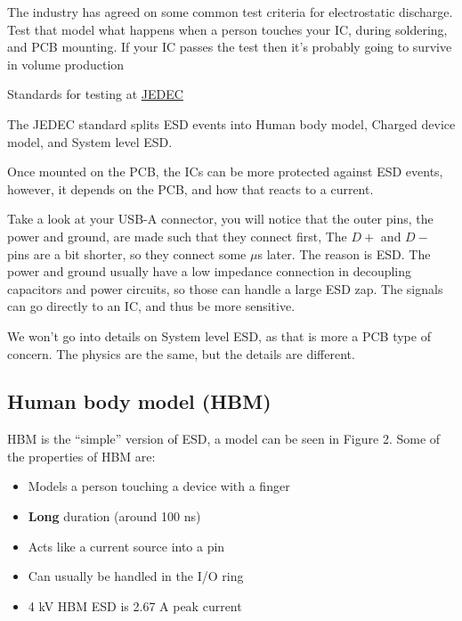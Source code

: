 The industry has agreed on some common test criteria for electrostatic
discharge. Test that model what happens when a person touches your IC,
during soldering, and PCB mounting. If your IC passes the test then it's
probably going to survive in volume production

Standards for testing at
\href{https://www.jedec.org/category/technology-focus-area/esd-electrostatic-discharge-0}{JEDEC}

The JEDEC standard splits ESD events into Human body model, Charged
device model, and System level ESD.

Once mounted on the PCB, the ICs can be more protected against ESD
events, however, it depends on the PCB, and how that reacts to a
current.

Take a look at your USB-A connector, you will notice that the outer
pins, the power and ground, are made such that they connect first, The
\(D+\) and \(D-\) pins are a bit shorter, so they connect some \(\mu\)s
later. The reason is ESD. The power and ground usually have a low
impedance connection in decoupling capacitors and power circuits, so
those can handle a large ESD zap. The signals can go directly to an IC,
and thus be more sensitive.

We won't go into details on System level ESD, as that is more a PCB type
of concern. The physics are the same, but the details are different.

\subsection{Human body model (HBM)}\label{human-body-model-hbm}

HBM is the ``simple'' version of ESD, a model can be seen in Figure 2.
Some of the properties of HBM are:

\begin{itemize}
\tightlist
\item
  Models a person touching a device with a finger
\item
  \textbf{Long} duration (around 100 ns)
\item
  Acts like a current source into a pin
\item
  Can usually be handled in the I/O ring
\item
  4 kV HBM ESD is 2.67 A peak current
\end{itemize}


{
\centering
{}
}

